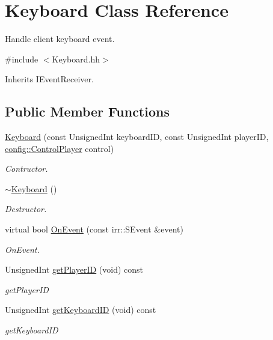 \hypertarget{classKeyboard}{}\section{Keyboard Class Reference}
\label{classKeyboard}


Handle client keyboard event.  




{\ttfamily \#include $<$Keyboard.\+hh$>$}



Inherits I\+Event\+Receiver.

\subsection*{Public Member Functions}
\begin{DoxyCompactItemize}
\item 
\hyperlink{classKeyboard_a36dbaafc28d5f7852da6c5f2fb4063e0}{Keyboard} (const Unsigned\+Int keyboard\+ID, const Unsigned\+Int player\+ID, \hyperlink{structconfig_1_1ControlPlayer}{config\+::\+Control\+Player} control)
\begin{DoxyCompactList}\small\item\em Contructor. \end{DoxyCompactList}\item 
\hyperlink{classKeyboard_af6a99ec66c8c722a45b967bf79167038}{$\sim$\+Keyboard} ()
\begin{DoxyCompactList}\small\item\em Destructor. \end{DoxyCompactList}\item 
virtual bool \hyperlink{classKeyboard_ad6974153a0c29b55c1b8765d0d6ccbfa}{On\+Event} (const irr\+::\+S\+Event \&event)
\begin{DoxyCompactList}\small\item\em On\+Event. \end{DoxyCompactList}\item 
Unsigned\+Int \hyperlink{classKeyboard_ac8fe530866f42dd3a62ea66054bc148b}{get\+Player\+ID} (void) const
\begin{DoxyCompactList}\small\item\em get\+Player\+ID \end{DoxyCompactList}\item 
Unsigned\+Int \hyperlink{classKeyboard_a8bc4a7d865e268c0d126aa3f0a913bbb}{get\+Keyboard\+ID} (void) const
\begin{DoxyCompactList}\small\item\em get\+Keyboard\+ID \end{DoxyCompactList}\end{DoxyCompactItemize}


